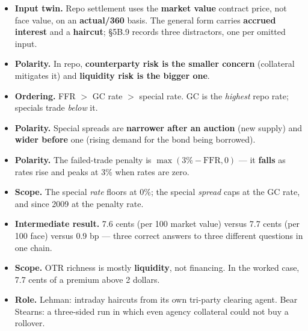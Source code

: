 \begin{lrtrapbox}
\begin{itemize}
\item \textbf{Input twin.} Repo settlement uses the \textbf{market value} contract price, not face value, on an \textbf{actual/360} basis. The general form carries \textbf{accrued interest} and a \textbf{haircut}; \S5B.9 records three distractors, one per omitted input.
\item \textbf{Polarity.} In repo, \textbf{counterparty risk is the smaller concern} (collateral mitigates it) and \textbf{liquidity risk is the bigger one}.
\item \textbf{Ordering.} FFR $>$ GC rate $>$ special rate. GC is the \emph{highest} repo rate; specials trade \emph{below} it.
\item \textbf{Polarity.} Special spreads are \textbf{narrower after an auction} (new supply) and \textbf{wider before} one (rising demand for the bond being borrowed).
\item \textbf{Polarity.} The failed-trade penalty is $\max(3\% - \text{FFR}, 0)$ --- it \textbf{falls} as rates rise and peaks at 3\% when rates are zero.
\item \textbf{Scope.} The special \emph{rate} floors at 0\%; the special \emph{spread} caps at the GC rate, and since 2009 at the penalty rate.
\item \textbf{Intermediate result.} 7.6 cents (per 100 market value) versus 7.7 cents (per 100 face) versus 0.9 bp --- three correct answers to three different questions in one chain.
\item \textbf{Scope.} OTR richness is mostly \textbf{liquidity}, not financing. In the worked case, 7.7 cents of a premium above 2 dollars.
\item \textbf{Role.} Lehman: intraday haircuts from its own tri-party clearing agent. Bear Stearns: a three-sided run in which even agency collateral could not buy a rollover.
\end{itemize}
\end{lrtrapbox}
